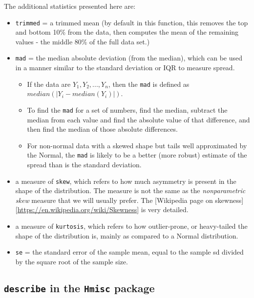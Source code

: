 \documentclass[
]{book}
\providecommand{\tightlist}{%
  \setlength{\itemsep}{0pt}\setlength{\parskip}{0pt}}
\begin{document}
The additional statistics presented here are:

\begin{itemize}
\tightlist
\item
  \texttt{trimmed} = a trimmed mean (by default in this function, this removes the top and bottom 10\% from the data, then computes the mean of the remaining values - the middle 80\% of the full data set.)
\item
  \texttt{mad} = the median absolute deviation (from the median), which can be used in a manner similar to the standard deviation or IQR to measure spread.

  \begin{itemize}
  \tightlist
  \item
    If the data are \(Y_1, Y_2, ..., Y_n\), then the \texttt{mad} is defined as \(median(|Y_i - median(Y_i)|)\).
  \item
    To find the \texttt{mad} for a set of numbers, find the median, subtract the median from each value and find the absolute value of that difference, and then find the median of those absolute differences.
  \item
    For non-normal data with a skewed shape but tails well approximated by the Normal, the \texttt{mad} is likely to be a better (more robust) estimate of the spread than is the standard deviation.
  \end{itemize}
\item
  a measure of \texttt{skew}, which refers to how much asymmetry is present in the shape of the distribution. The measure is not the same as the \emph{nonparametric skew} measure that we will usually prefer. The {[}Wikipedia page on skewness{]}{[}\url{https://en.wikipedia.org/wiki/Skewness}{]} is very detailed.
\item
  a measure of \texttt{kurtosis}, which refers to how outlier-prone, or heavy-tailed the shape of the distribution is, mainly as compared to a Normal distribution.
\item
  \texttt{se} = the standard error of the sample mean, equal to the sample sd divided by the square root of the sample size.
\end{itemize}

\hypertarget{describe-in-the-hmisc-package}{%
\subsection{\texorpdfstring{\texttt{describe} in the \texttt{Hmisc} package}{describe in the Hmisc package}}\label{describe-in-the-hmisc-package}}
\end{document}
